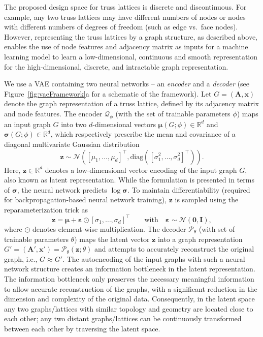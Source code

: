 \documentclass[fleqn,10pt]{wlscirep}
\newcommand{\boldface}[1]{\boldsymbol{#1}}
\newcommand{\bfx}{\boldface{x}}
\newcommand{\bfz}{\boldface{z}}
\newcommand{\bfA}{\boldface{A}}
\newcommand{\bfI}{\boldface{I}}
\newcommand{\bfeps}{\boldsymbol{\varepsilon}}
\newcommand{\bfmu}{\boldsymbol{\mu}}
\newcommand{\bfsigma}{\boldsymbol{\sigma}}
\newcommand{\calN}{\mathcal{N}}
\newcommand{\calP}{\mathcal{P}}
\newcommand{\calQ}{\mathcal{Q}}
\newcommand{\Rset}{\mathbb{R}}
\newcommand{\be}{\begin{equation}}
\newcommand{\ee}{\end{equation}}
\renewcommand{\figurename}{Figure}
\begin{document}
The proposed design space for truss lattices is discrete and discontinuous. For example, any two truss lattices may have different numbers of nodes or nodes with different numbers of degrees of freedom (such as edge vs.~face nodes). However, representing the truss lattices by a graph structure, as described above, enables the use of node features and adjacency matrix as inputs for a machine learning model to learn a low-dimensional, continuous and smooth representation for the high-dimensional, discrete, and intractable graph representation.

We use a VAE containing two neural networks -- an \textit{encoder} and a \textit{decoder} (see \figurename~\ref{fig:vaeFramework}a for a schematic of the framework). Let $G=(\bfA,\bfx)$ denote the graph representation of a truss lattice, defined by its adjacency matrix and node features. The encoder $\calQ_\phi$ (with the set of trainable parameters $\phi$) maps an input graph $G$ into two $d$-dimensional vectors $\bfmu(G;\phi)\in \Rset^{d}$ and $\bfsigma(G;\phi)\in\Rset^d$, which respectively prescribe the mean and covariance of a diagonal multivariate Gaussian distribution
\be
\bfz\sim \calN\left([\mu_1,\dots,\mu_d]^\intercal,\text{diag}\left([\sigma_1^2,\dots,\sigma_d^2]^\intercal\right)\right).
\ee
Here, $\bfz\in \Rset^d$ denotes a low-dimensional vector encoding of the input graph $G$, also known as latent representation. While the formulation is presented in terms of $\bfsigma$, the neural network predicts $\log\bfsigma$. To maintain differentiability (required for backpropagation-based neural network training), $\bfz$ is sampled using the reparameterization trick \cite{kingma2013auto} as
\be
\bfz= \bfmu + \bfeps \odot [\sigma_1,\dots,\sigma_d]^\intercal\qquad \text{with} \quad \bfeps\sim\calN(\boldsymbol{0},\bfI),
\ee
where $\odot$ denotes element-wise multiplication. The decoder $\calP_\theta$ (with set of trainable parameters $\theta$) maps the latent vector $\bfz$ into a graph representation $G'=(\bfA',\bfx')=\calP_\theta(\bfz;\theta)$ and  attempts to accurately reconstruct the original graph, i.e., $G\approx G'$. The autoencoding of the input graphs with such a neural network structure creates an information bottleneck \cite{tishby2000information} in the latent representation. The information bottleneck only preserves the necessary meaningful information to allow accurate reconstruction of the graphs, with a significant reduction in the dimension and complexity of the original data. Consequently, in the latent space any two graphs/lattices with similar topology and geometry are located close to each other; any two distant graphs/lattices can be continuously transformed between each other by traversing the latent space. 
\end{document}
